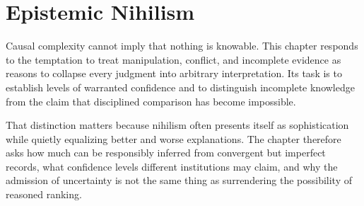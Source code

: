 
\chapter{Epistemic Nihilism}
\label{ch:ch094}

Causal complexity cannot imply that nothing is knowable. This chapter responds to the temptation to treat manipulation, conflict, and incomplete evidence as reasons to collapse every judgment into arbitrary interpretation. Its task is to establish levels of warranted confidence and to distinguish incomplete knowledge from the claim that disciplined comparison has become impossible.

That distinction matters because nihilism often presents itself as sophistication while quietly equalizing better and worse explanations. The chapter therefore asks how much can be responsibly inferred from convergent but imperfect records, what confidence levels different institutions may claim, and why the admission of uncertainty is not the same thing as surrendering the possibility of reasoned ranking.
